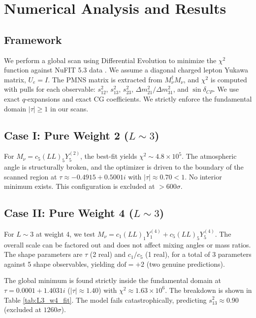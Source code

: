 \documentclass[11pt, a4paper]{article}
\begin{document}
\section{Numerical Analysis and Results}
\subsection{Framework}
We perform a global scan using Differential Evolution to minimize the \(\chi^2\) function against NuFIT 5.3 data \cite{NuFIT}. We assume a diagonal charged lepton Yukawa matrix, \(U_e = I\). The PMNS matrix is extracted from \(M_\nu^\dagger M_\nu\), and \(\chi^2\) is computed with pulls for each observable: \(s_{12}^2\), \(s_{13}^2\), \(s_{23}^2\), \(\Delta m^2_{21}/\Delta m^2_{31}\), and \(\sin\delta_{CP}\). We use exact \(q\)-expansions and exact CG coefficients. We strictly enforce the fundamental domain \(|\tau|\ge 1\) in our scans.

\subsection{Case I: Pure Weight 2 (\(L \sim 3\))}
For \(M_\nu = c_5 (LL)_5 Y_5^{(2)}\), the best-fit yields \(\chi^2 \sim 4.8 \times 10^5\). The atmospheric angle is structurally broken, and the optimizer is driven to the boundary of the scanned region at \(\tau \approx -0.4915+0.5001i\) with \(|\tau|\approx 0.70<1\). No interior minimum exists. This configuration is excluded at \(>600\sigma\). 

\subsection{Case II: Pure Weight 4 (\(L \sim 3\))}
For \(L \sim 3\) at weight 4, we test \(M_\nu = c_1(LL)_1 Y_1^{(4)} + c_5(LL)_5 Y_5^{(4)}\). The overall scale can be factored out and does not affect mixing angles or mass ratios. The shape parameters are \(\tau\) (2 real) and \(c_1/c_5\) (1 real), for a total of 3 parameters against 5 shape observables, yielding \(\mathrm{dof}=+2\) (two genuine predictions).

The global minimum is found strictly inside the fundamental domain at \(\tau = 0.0001 + 1.4031 i\) (\(|\tau| \approx 1.40\)) with \(\chi^2 \approx 1.63 \times 10^6\). The breakdown is shown in Table \ref{tab:L3_w4_fit}. The model fails catastrophically, predicting \(s_{13}^2 \approx 0.90\) (excluded at \(1260\sigma\)).
\end{document}

